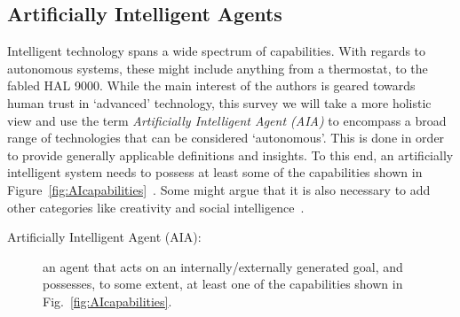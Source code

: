 \subsection{Artificially Intelligent Agents} \label{sec:aias}
    Intelligent technology spans a wide spectrum of capabilities. With regards to autonomous systems, these might include anything from a thermostat, to the fabled HAL 9000. While the main interest of the authors is geared towards human trust in `advanced' technology, this survey we will take a more holistic view and use the term \textit{Artificially Intelligent Agent (AIA)} to encompass a broad range of technologies that can be considered `autonomous'. This is done in order to provide generally applicable definitions and insights. 
%
To this end, an artificially intelligent system needs to possess at least some of the capabilities shown in Figure~\ref{fig:AIcapabilities}~\cite{Russell2010-wv,Nilsson2009-rp,Luger2008-vf}. Some might argue that it is also necessary to add other categories like creativity and social intelligence~\cite{Tao2005-kh}. 
    \begin{description}
        \item[Artificially Intelligent Agent (AIA):] an agent that acts on an internally/externally generated goal, and possesses, to some extent, at least one of the capabilities shown in Fig.~\ref{fig:AIcapabilities}.
    \end{description}

